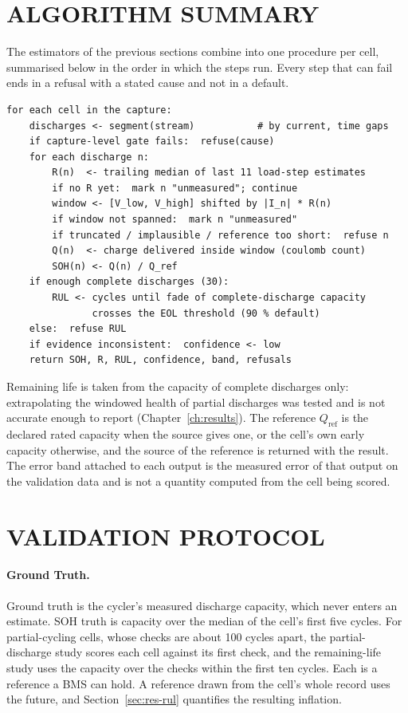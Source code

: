 \section{ALGORITHM SUMMARY}

The estimators of the previous sections combine into one procedure per cell, summarised below in the order in which the steps run. Every step that can fail ends in a refusal with a stated cause and not in a default.

\begin{footnotesize}
\begin{verbatim}
for each cell in the capture:
    discharges <- segment(stream)           # by current, time gaps
    if capture-level gate fails:  refuse(cause)
    for each discharge n:
        R(n)  <- trailing median of last 11 load-step estimates
        if no R yet:  mark n "unmeasured"; continue
        window <- [V_low, V_high] shifted by |I_n| * R(n)
        if window not spanned:  mark n "unmeasured"
        if truncated / implausible / reference too short:  refuse n
        Q(n)  <- charge delivered inside window (coulomb count)
        SOH(n) <- Q(n) / Q_ref
    if enough complete discharges (30):
        RUL <- cycles until fade of complete-discharge capacity
               crosses the EOL threshold (90 % default)
    else:  refuse RUL
    if evidence inconsistent:  confidence <- low
    return SOH, R, RUL, confidence, band, refusals
\end{verbatim}
\end{footnotesize}

Remaining life is taken from the capacity of complete discharges only: extrapolating the windowed health of partial discharges was tested and is not accurate enough to report (Chapter~\ref{ch:results}). The reference $Q_{\mathrm{ref}}$ is the declared rated capacity when the source gives one, or the cell's own early capacity otherwise, and the source of the reference is returned with the result. The error band attached to each output is the measured error of that output on the validation data and is not a quantity computed from the cell being scored.

\section{VALIDATION PROTOCOL}
\label{sec:protocol}

\paragraph{Ground Truth.} Ground truth is the cycler's measured discharge capacity, which never enters an estimate. SOH truth is capacity over the median of the cell's first five cycles. For partial-cycling cells, whose checks are about 100 cycles apart, the partial-discharge study scores each cell against its first check, and the remaining-life study uses the capacity over the checks within the first ten cycles. Each is a reference a BMS can hold. A reference drawn from the cell's whole record uses the future, and Section~\ref{sec:res-rul} quantifies the resulting inflation.

